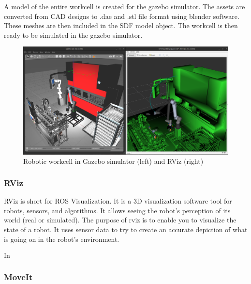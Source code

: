 A model of the entire workcell is created for the gazebo simulator. The assets are converted from CAD designs
to .dae and .stl file format using blender software. These meshes are then included in the SDF model object.
The workcell is then ready to be simulated in the gazebo simulator.

\begin{figure}[h]
    \centering
    \includegraphics[width=\textwidth]{figures/gazebo-rviz.png}
    \caption{Robotic workcell in Gazebo simulator (left) and RViz (right)}
    \label{fig:gazebo-rviz}
\end{figure}

\subsubsection{RViz}
\label{subsubsec:RViz}
RViz is short for ROS Visualization. It is a 3D visualization software tool for robots, sensors, and algorithms.
It allows seeing the robot's perception of its world (real or simulated).
The purpose of rviz is to enable you to visualize the state of a robot. It uses sensor data to try
to create an accurate depiction of what is going on in the robot's environment.

In

\subsubsection{MoveIt}
\label{subsubsec:moveit}